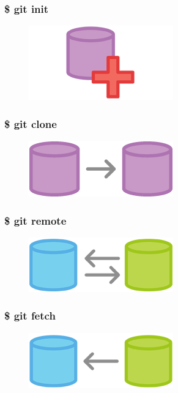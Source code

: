 \documentclass{beamer}
\begin{document}
\begin{frame}
    \frametitle{\$ git init}
    \begin{figure}[h!]
        \begin{center}
            \includegraphics[scale=0.8]{init.png}
        \end{center}
    \end{figure}
\end{frame}

\begin{frame}
    \frametitle{\$ git clone}
    \begin{figure}[h!]
        \begin{center}
            \includegraphics[scale=0.8]{clone.png}
        \end{center}
    \end{figure}
\end{frame}

\begin{frame}
    \frametitle{\$ git remote}
    \begin{figure}[h!]
        \begin{center}
            \includegraphics[scale=0.8]{remote.png}
        \end{center}
    \end{figure}
\end{frame}

\begin{frame}
    \frametitle{\$ git fetch}
    \begin{figure}[h!]
        \begin{center}
            \includegraphics[scale=0.8]{pull.png}
        \end{center}
    \end{figure}
\end{frame}
\end{document}
